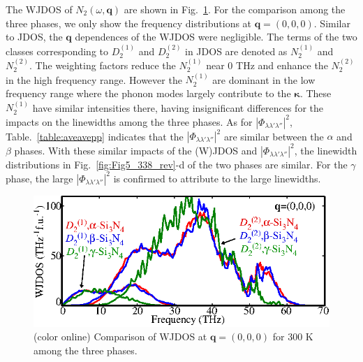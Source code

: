 \documentclass[twocolumn,amsmath,amssymb,a4paper,prb,superscriptaddress,floatfix]{revtex4-1}
\begin{document}
The WJDOS of $N_2(\omega,\mathbf{q})$ are shown in Fig.~\ref{fig:Fig_wjdos}. For
the comparison among the three phases, we only show the frequency distributions
at $\mathbf{q}=(0,0,0)$. Similar to JDOS, the $\mathbf{q}$ dependences of the
WJDOS were negligible. The terms of the two classes corresponding to $D_2^{(1)}$
and $D_2^{(2)}$ in JDOS are denoted as $N_2^{(1)}$ and $N_2^{(2)}$.  The
weighting factors reduce the $N_2^{(1)}$ near 0 THz and enhance the $N_2^{(2)}$
in the high frequency range. However the $N_2^{(1)}$ are dominant in the low
frequency range where the phonon modes largely contribute to the
$\boldsymbol{\kappa}$. These $N_2^{(1)}$ have similar intensities there, having
insignificant differences for the impacts on the linewidths among the three
phases. As for $|\Phi_{\lambda\lambda'\lambda''}|^2$,
Table.~\ref{table:aveavepp} indicates that the
$|\Phi_{\lambda\lambda'\lambda''}|^2$ are similar between the $\alpha$ and
$\beta$ phases.  With these similar impacts of the (W)JDOS and
$|\Phi_{\lambda\lambda'\lambda''}|^2$, the linewidth distributions in
Fig.~\ref{fig:Fig5_338_rev}-d of the two phases are similar.  For the $\gamma$
phase, the large $|\Phi_{\lambda\lambda'\lambda''}|^2$ is confirmed to attribute
to the large linewidths. 

\begin{figure}[ht]
 \centering
  \includegraphics[width=0.9\linewidth]{Fig_wjdos.eps} \caption{(color
	  online) Comparison of WJDOS at $\mathbf{q}=(0,0,0)$ for 300 K among the three phases. 
		  } \label{fig:Fig_wjdos} 
 \centering
\end{figure}
\end{document}

